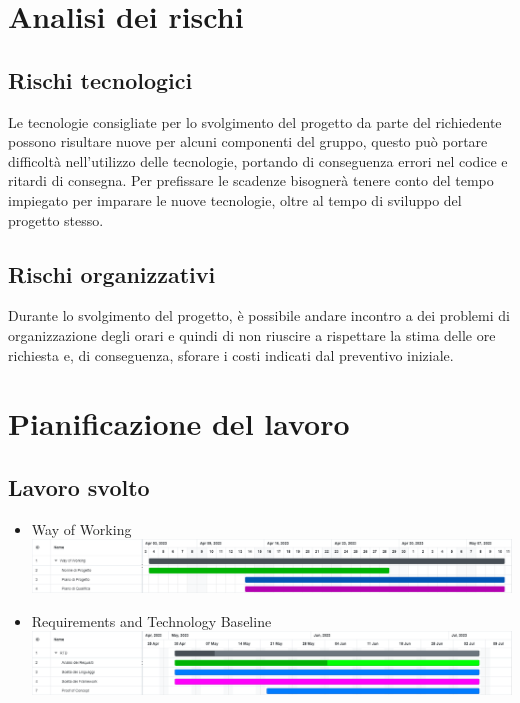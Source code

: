 \documentclass[a4paper, 12pt]{article}
\begin{document}
\makeindexdetails
\makefrontpage \makeversioni
\tableofcontents
\newpage
\clearpage
{} 

\section{Analisi dei rischi}

\subsection{Rischi tecnologici}
Le tecnologie consigliate per lo svolgimento del progetto da parte del richiedente possono risultare nuove per alcuni componenti del gruppo, questo può portare difficoltà nell'utilizzo delle tecnologie, portando di conseguenza errori nel codice e ritardi di consegna. \newline
Per prefissare le scadenze bisognerà tenere conto del tempo impiegato per imparare le nuove tecnologie, oltre al tempo di sviluppo del progetto stesso.

\subsection{Rischi organizzativi}
Durante lo svolgimento del progetto, è possibile andare incontro a dei problemi di organizzazione degli orari e quindi di non riuscire a rispettare la stima delle ore richiesta e, di conseguenza, sforare i costi indicati dal preventivo iniziale.
\newpage
\section{Pianificazione del lavoro}

\subsection{Lavoro svolto}



\begin{itemize}
    \item Way of Working\newline
    \includegraphics[scale=0.24]{WoW_2.png}\newline
    \item Requirements and Technology Baseline\newline
    \includegraphics[scale=0.24]{RTB_2.png}\newline
\end{itemize}
\end{document}
